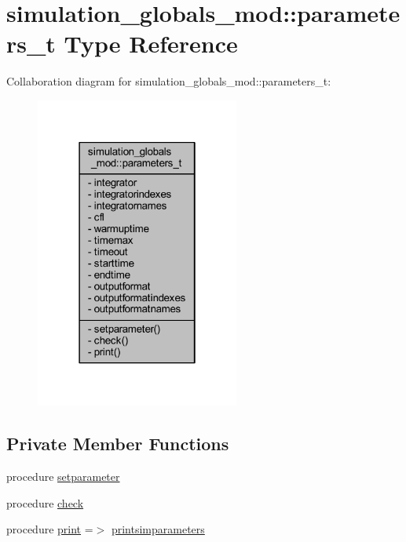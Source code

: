 \hypertarget{structsimulation__globals__mod_1_1parameters__t}{}\section{simulation\+\_\+globals\+\_\+mod\+:\+:parameters\+\_\+t Type Reference}
\label{structsimulation__globals__mod_1_1parameters__t}


Collaboration diagram for simulation\+\_\+globals\+\_\+mod\+:\+:parameters\+\_\+t\+:
\nopagebreak
\begin{figure}[H]
\begin{center}
\leavevmode
\includegraphics[width=190pt]{structsimulation__globals__mod_1_1parameters__t__coll__graph}
\end{center}
\end{figure}
\subsection*{Private Member Functions}
\begin{DoxyCompactItemize}
\item 
procedure \mbox{\hyperlink{structsimulation__globals__mod_1_1parameters__t_ab4df8a29214aa31b554483bb8c07004c}{setparameter}}
\item 
procedure \mbox{\hyperlink{structsimulation__globals__mod_1_1parameters__t_ab0dc483d1a0d000e43726c19c892a65d}{check}}
\item 
procedure \mbox{\hyperlink{structsimulation__globals__mod_1_1parameters__t_a220b7b25f77a4e33694055d5427a30dd}{print}} =$>$ \mbox{\hyperlink{namespacesimulation__globals__mod_a97c04d0289a9f2d004a9329cb7ab16f0}{printsimparameters}}
\end{DoxyCompactItemize}
